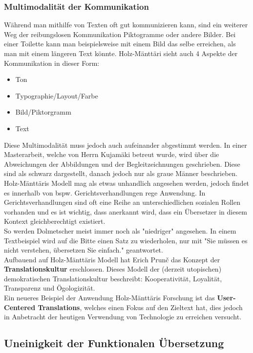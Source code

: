 \documentclass{article}
\begin{document}
	\subsubsection{Multimodalität der Kommunikation}
	Während man mithilfe von Texten oft gut kommunizieren kann, sind ein weiterer Weg der reibungslosen Kommunikation Piktogramme oder andere Bilder. Bei einer Toilette kann man beispielsweise mit einem Bild das selbe erreichen, als man mit einem längeren Text könnte. Holz-Mänttäri sieht auch 4 Aspekte der Kommunikation in dieser Form:
	\begin{itemize}
		\item{Ton}
		\item{Typographie/Layout/Farbe}
		\item{Bild/Piktorgramm}
		\item{Text}
	\end{itemize}

	Diese Multimodalität muss jedoch auch aufeinander abgestimmt werden. In einer Masterarbeit, welche von Herrn Kujamäki betreut wurde, wird über die Abweichungen der Abbildungen und der Begleitzeichnungen geschrieben. Diese sind als schwarz dargestellt, danach jedoch nur als graue Männer beschrieben. \\
	Holz-Mänttäris Modell mag als etwas unhandlich angesehen werden, jedoch findet es innerhalb von bspw. Gerichtsverhandlungen rege Anwendung. In Gerichtsverhandlungen sind oft eine Reihe an unterschiedlichen sozialen Rollen vorhanden und es ist wichtig, dass anerkannt wird, dass ein Übersetzer in diesem Kontext gleichberechtigt existiert. \\
	So werden Dolmetscher meist immer noch als "niedriger" angesehen. In einem Textbeispiel wird auf die Bitte einen Satz zu wiederholen, nur mit "Sie müssen es nicht verstehen, übersetzen Sie einfach." geantwortet. \\
	Aufbauend auf Holz-Mänttäris Modell hat Erich Prun\v c das Konzept der \textbf{Translationskultur} erschlossen. Dieses Modell der (derzeit utopischen) demokratischen Translationskultur beschreibt: Kooperativität, Loyalität, Transparenz und Ögologizität.\\
	Ein neueres Beispiel der Anwendung Holz-Mänttäris Forschung ist das \textbf{User-Centered Translations}, welches einen Fokus auf den Zieltext hat, dies jedoch in Anbetracht der heutigen Verwendung von Technologie zu erreichen versucht. \\
	\subsection{Uneinigkeit der Funktionalen Übersetzung}
\end{document}
